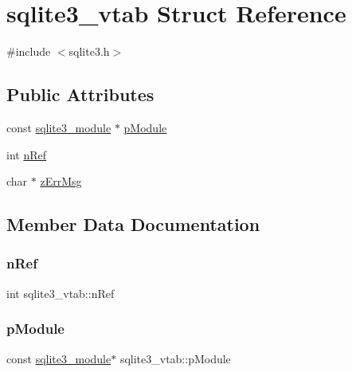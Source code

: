 \hypertarget{structsqlite3__vtab}{}\section{sqlite3\+\_\+vtab Struct Reference}
\label{structsqlite3__vtab}


{\ttfamily \#include $<$sqlite3.\+h$>$}

\subsection*{Public Attributes}
\begin{DoxyCompactItemize}
\item 
const \mbox{\hyperlink{structsqlite3__module}{sqlite3\+\_\+module}} $\ast$ \mbox{\hyperlink{structsqlite3__vtab_a4ef8198ca611b73a9b23054dd1e91e2b}{p\+Module}}
\item 
int \mbox{\hyperlink{structsqlite3__vtab_ab3c80d385849bdd82363a0df7d6fcba8}{n\+Ref}}
\item 
char $\ast$ \mbox{\hyperlink{structsqlite3__vtab_afc50eadfdd7cef876633d460deba48d6}{z\+Err\+Msg}}
\end{DoxyCompactItemize}


\subsection{Member Data Documentation}
\mbox{\label{structsqlite3__vtab_ab3c80d385849bdd82363a0df7d6fcba8}} 
\subsubsection{\texorpdfstring{nRef}{nRef}}
{\footnotesize\ttfamily int sqlite3\+\_\+vtab\+::n\+Ref}

\mbox{\label{structsqlite3__vtab_a4ef8198ca611b73a9b23054dd1e91e2b}} 
\subsubsection{\texorpdfstring{pModule}{pModule}}
{\footnotesize\ttfamily const \mbox{\hyperlink{structsqlite3__module}{sqlite3\+\_\+module}}$\ast$ sqlite3\+\_\+vtab\+::p\+Module}

